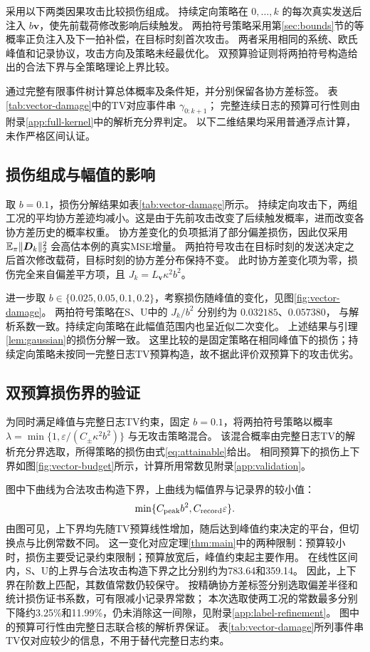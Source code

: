 采用以下两类因果攻击比较损伤组成。
持续定向策略在 $0,\ldots,k$ 的每次真实发送后注入 $b{\bm{v}}$，使先前载荷修改影响后续触发。
两拍符号策略采用第\ref{sec:bounds}节的等概率正负注入及下一拍补偿，在目标时刻首次攻击。
两者采用相同的系统、欧氏峰值和记录协议，攻击方向及策略未经最优化。
双预算验证则将两拍符号构造给出的合法下界与全策略理论上界比较。

通过完整有限事件树计算总体概率及条件矩，并分别保留各协方差标签。
表\ref{tab:vector-damage}中的TV对应事件串 $\gamma_{0:k+1}$；
完整连续日志的预算可行性则由附录\ref{app:full-kernel}中的解析充分界判定。
以下二维结果均采用普通浮点计算，未作严格区间认证。



\subsection{损伤组成与幅值的影响}

取 $b=0.1$，损伤分解结果如表\ref{tab:vector-damage}所示。
持续定向攻击下，两组工况的平均协方差迹均减小。这是由于先前攻击改变了后续触发概率，进而改变各协方差历史的概率权重。
协方差变化的负项抵消了部分偏差损伤，因此仅采用 $\mathbb E_\pi\|{\bm{D}}_k\|_2^2$ 会高估本例的真实MSE增量。
两拍符号攻击在目标时刻的发送决定之后首次修改载荷，目标时刻的协方差分布保持不变。
此时协方差变化项为零，损伤完全来自偏差平方项，且 $J_k=L_{\bm{v}}\kappa^2b^2$。


进一步取 $b\in\{0.025,0.05,0.1,0.2\}$，考察损伤随峰值的变化，见图\ref{fig:vector-damage}。
两拍符号策略在S、U中的 $J_k/b^2$ 分别约为 $0.032185$、$0.057380$，
与解析系数一致。持续定向策略在此幅值范围内也呈近似二次变化。
上述结果与引理\ref{lem:gaussian}的损伤分解一致。
这里比较的是固定策略在相同峰值下的损伤；持续定向策略未按同一完整日志TV预算构造，故不据此评价双预算下的攻击优劣。




\subsection{双预算损伤界的验证}
为同时满足峰值与完整日志TV约束，固定 $b=0.1$，将两拍符号策略以概率
$\lambda=\min\{1,\varepsilon/(C_\pm\kappa^2b^2)\}$ 与无攻击策略混合。
该混合概率由完整日志TV的解析充分界选取，所得策略的损伤由式\eqref{eq:attainable}给出。
相同预算下的损伤上下界如图\ref{fig:vector-budget}所示，计算所用常数见附录\ref{app:validation}。


图中下曲线为合法攻击构造下界，上曲线为幅值界与记录界的较小值：
\[\min\{C_{\rm peak}b^2,C_{\rm record}\varepsilon\}.\]
由图可见，上下界均先随TV预算线性增加，随后达到峰值约束决定的平台，但切换点与比例常数不同。
这一变化对应定理\ref{thm:main}中的两种限制：预算较小时，损伤主要受记录约束限制；预算放宽后，峰值约束起主要作用。
在线性区间内，S、U的上界与合法攻击构造下界之比分别约为783.64和359.14。
因此，上下界在阶数上匹配，其数值常数仍较保守。
按精确协方差标签分别选取偏差半径和统计损伤证书系数，可有限减小记录界常数；
本次选取使两工况的常数最多分别下降约3.25\%和11.99\%，仍未消除这一间隙，见附录\ref{app:label-refinement}。
图中的预算可行性由完整日志联合核的解析界保证。
表\ref{tab:vector-damage}所列事件串TV仅对应较少的信息，不用于替代完整日志约束。


